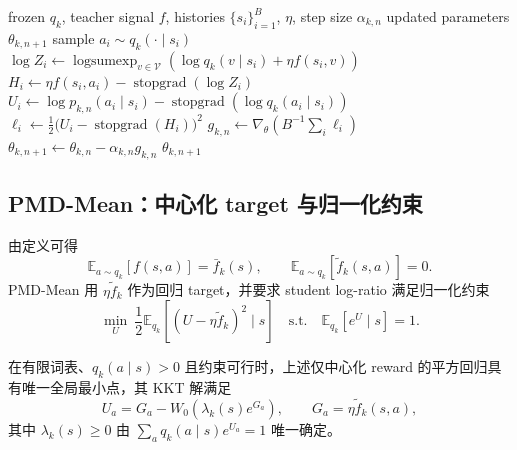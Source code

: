 \documentclass[lang=cn,scheme=chinese,openany]{../book/elegantbook}
\begin{document}
\begin{algorithm}[ht]
\caption{PMD-Part inner update\\{\small\textit{Semantics: 固定 anchor 下的完整 Gibbs log-ratio 回归}}}
\begin{algorithmic}[1]
\Require frozen $ q_k$, teacher signal $f$, histories $\{s_i\}_{i=1}^B$, $\eta$, step size $\alpha_{k,n}$
\Ensure updated parameters $\theta_{k,n+1}$
    \State sample $a_i\sim q_k(\cdot\mid s_i)$
    \State $\log Z_i\gets\operatorname{logsumexp}_{v\in\mathcal V}(\log q_k(v\mid s_i)+\eta f(s_i,v))$
    \State $H_i\gets\eta f(s_i,a_i)-\operatorname{stopgrad}(\log Z_i)$
    \State $U_i\gets\log p_{k,n}(a_i\mid s_i)-\operatorname{stopgrad}(\log q_k(a_i\mid s_i))$
    \State $\ell_i\gets\frac12\bigl(U_i-\operatorname{stopgrad}(H_i)\bigr)^2$
\EndFor
\State $g_{k,n}\gets\nabla_\theta(B^{-1}\sum_i\ell_i)$
\State $\theta_{k,n+1}\gets\theta_{k,n}-\alpha_{k,n}g_{k,n}$
\State \Return $\theta_{k,n+1}$
\end{algorithmic}
\end{algorithm}

\subsection{PMD-Mean：中心化 target 与归一化约束}
\label{sec:ch2-pmd-mean}

由定义可得
\begin{equation*}
\mathbb E_{a\sim q_k}[f(s,a)]=\bar f_k(s),
\qquad
\mathbb E_{a\sim q_k}[\widetilde f_k(s,a)]=0.
\end{equation*}
PMD-Mean 用 $\eta\widetilde f_k$ 作为回归 target，并要求 student log-ratio 满足归一化约束
\begin{equation}
\label{eq:ch2-mean-loss}
\min_{U}\ \frac12\mathbb E_{ q_k}\left[(U-\eta\widetilde f_k)^2\mid s\right]
\quad\text{s.t.}\quad
\mathbb E_{ q_k}[e^{U}\mid s]=1.
\end{equation}

\begin{theorem}
\label{thm:ch2-mean-lambert}
在有限词表、$ q_k(a\mid s)>0$ 且约束可行时，上述仅中心化 reward 的平方回归具有唯一全局最小点，其 KKT 解满足
\begin{equation}
\label{eq:ch2-mean-lambert-theorem}
U_a=G_a-W_0\!\left(\lambda_k(s)e^{G_a}\right),\qquad
G_a=\eta\widetilde f_k(s,a),
\end{equation}
其中 $\lambda_k(s)\geq0$ 由 $\sum_a q_k(a\mid s)e^{U_a}=1$ 唯一确定。
\end{theorem}
\end{document}
